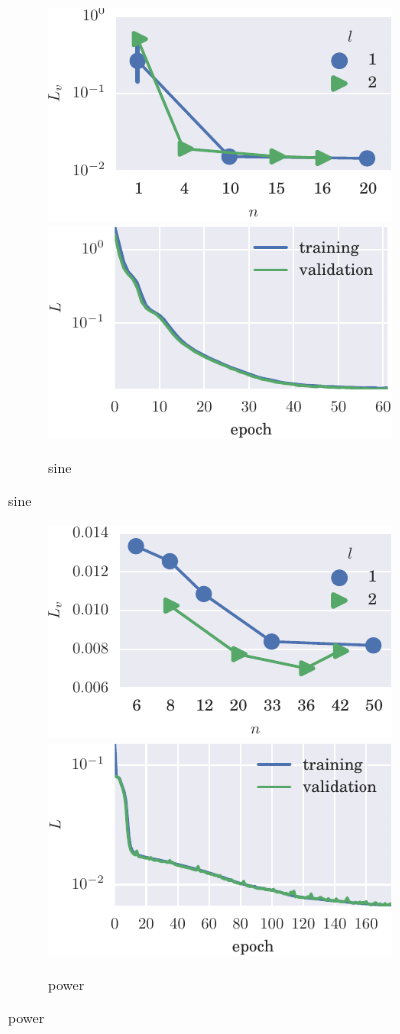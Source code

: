 \begin{figure}[!hp]
\ContinuedFloat
  
    \begin{subfigure}[t]{\textwidth}
        \includegraphics[width=.5\textwidth]{figs/bo_sin.pdf}
        \includegraphics[width=.5\textwidth]{figs/trn_sin.pdf}
        \caption{sine}
    \end{subfigure}%

\end{figure}
\begin{figure}[!hp]
\ContinuedFloat

    \begin{subfigure}[t]{\textwidth} 
        \includegraphics[width=.5\textwidth]{figs/bo_power.pdf}
        \includegraphics[width=.5\textwidth]{figs/trn_power.pdf}
        \caption{power}
    \end{subfigure}%

\end{figure}
